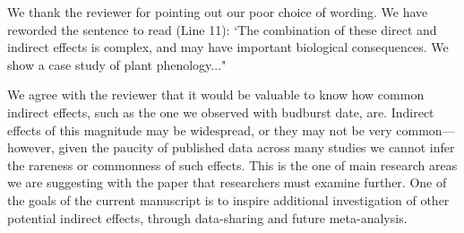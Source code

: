 \documentclass[11pt,a4paper]{letter}
\begin{document}
\begin{letter}{}
\begin{enumerate}
\begin{enumerate}
\par We thank the reviewer for pointing out our poor choice of wording. We have reworded the sentence to read (Line 11): `The combination of these direct and indirect effects is complex, and may have important biological consequences. We show a case study of plant phenology..."

\par We agree with the reviewer that it would be valuable to know how common indirect effects, such as the one we observed with budburst date, are. Indirect effects of this magnitude may be widespread, or they may not be very common---however, given the paucity of published data across many studies we cannot infer the rareness or commonness of such effects. This is the one of main research areas we are suggesting with the paper that researchers must examine further. One of the goals of the current manuscript is to inspire additional investigation of other potential indirect effects, through data-sharing and future meta-analysis. \\


\end{enumerate}
\end{enumerate}
\end{letter}
\end{document}
